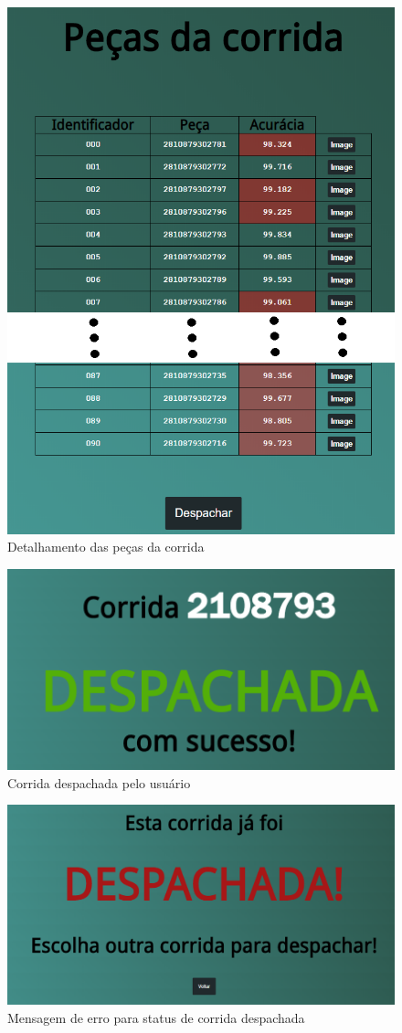\begin{figure}[H]
	\centering
	\includegraphics[width=0.65\linewidth]{figuras/WebService/Screens/detail 2.1.png}
	\caption{Detalhamento das peças da corrida}
	\label{fig:detail2.1}
\end{figure}

\begin{figure}[H]
	\centering
	\includegraphics[width=0.5\linewidth]{figuras/WebService/Screens/corrida_desp.png}
	\caption{Corrida despachada pelo usuário}
	\label{fig:corrida_desp}
\end{figure}

\begin{figure}[H]
	\centering
	\includegraphics[width=0.5\linewidth]{figuras/WebService/Screens/corrida_desp_X.png}
	\caption{Mensagem de erro para status de corrida despachada}
	\label{fig:corrida_desp_x}
\end{figure}

